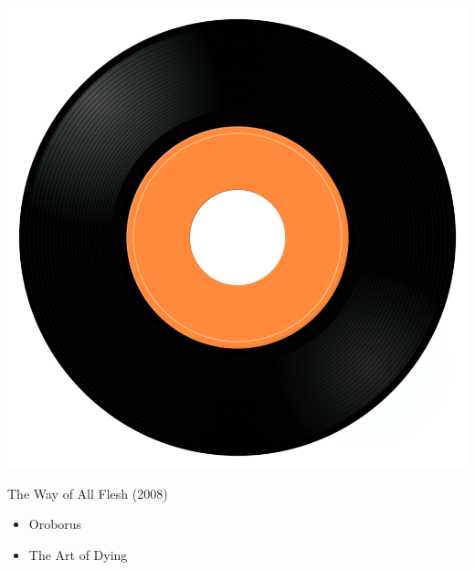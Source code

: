 \begin{minipage}[t]{0.25\textwidth}\vspace{0pt}
\captionsetup{type=figure}
\includegraphics[width=\textwidth]{Images/cover.png}
\caption*{The Way of All Flesh  (2008)}
\end{minipage}
\begin{minipage}[t]{0.25\textwidth}\vspace{0pt}
\begin{itemize}[nosep,leftmargin=1em,labelwidth=*,align=left]
	\setlength{\itemsep}{0pt}
	\item Oroborus
	\item The Art of Dying
\end{itemize}
\end{minipage}
